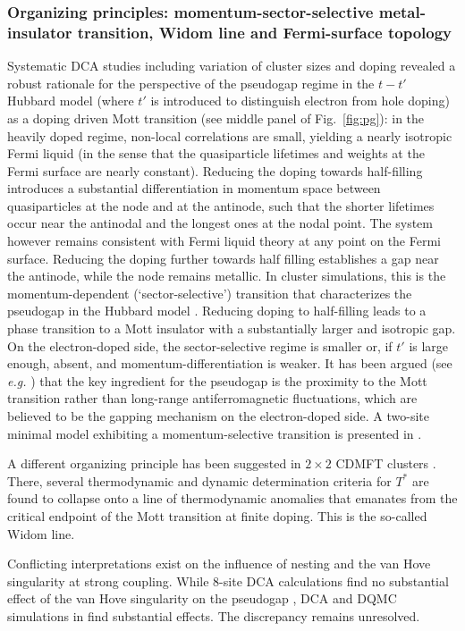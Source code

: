 \documentclass{ar-1col}
\begin{document}
\subsubsection{Organizing principles: momentum-sector-selective metal-insulator transition, Widom line and Fermi-surface topology} Systematic DCA studies including variation of cluster sizes and doping \cite{Gull10} revealed a robust rationale for the perspective of the pseudogap regime in the $t-t'$ Hubbard model (where $t'$ is introduced to distinguish electron from hole doping) as a doping driven Mott transition (see middle panel of Fig.~\ref{fig:pg}): in the heavily doped regime, non-local correlations are small, yielding a nearly isotropic Fermi liquid (in the sense that the quasiparticle lifetimes and weights at the Fermi surface are nearly constant). 
Reducing the doping towards half-filling introduces a substantial differentiation in momentum space between quasiparticles at the node and at the antinode, such that the shorter lifetimes occur near the antinodal and the longest ones at the nodal point. The system however remains consistent with Fermi liquid theory at any point on the Fermi surface.
Reducing the doping further towards half filling establishes a gap near the antinode, while the node remains metallic. In cluster simulations, this is the momentum-dependent (`sector-selective') transition that characterizes the pseudogap in the Hubbard model \cite{Gull09}.
Reducing doping to half-filling leads to a phase transition to a Mott insulator with a substantially larger and isotropic gap. 
On the electron-doped side, the sector-selective regime is smaller or, if $t'$ is large enough, absent, and momentum-differentiation is weaker. It has been argued (see {\it e.g.} \cite{Parcollet04}) that the key ingredient for the pseudogap is the proximity to the Mott transition rather than long-range antiferromagnetic fluctuations, which are believed to be the gapping mechanism on the electron-doped side. A two-site minimal model exhibiting a momentum-selective transition is presented in \cite{Ferrero09A,Ferrero09}.

A different organizing principle has been suggested in $2\times 2$ CDMFT clusters \cite{Sordi12}. There, several thermodynamic and dynamic determination criteria for $T^*$ are found to collapse onto a line of thermodynamic anomalies that emanates from the critical endpoint of the Mott transition at finite doping. This is the so-called Widom line.

Conflicting interpretations exist on the influence of nesting and the van Hove singularity at strong coupling. While $8$-site DCA calculations find no substantial effect of the van Hove singularity on the pseudogap \cite{Gull09}, DCA and DQMC simulations in \cite{Wu18,Wu20} find substantial effects. The discrepancy remains unresolved.
\end{document}
